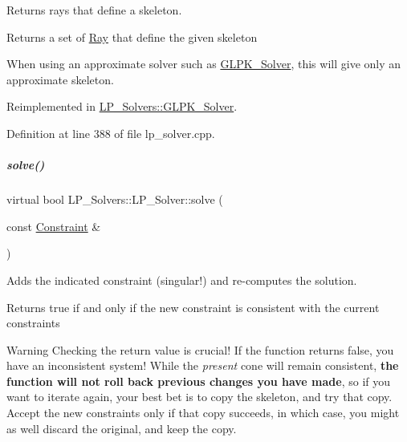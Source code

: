 Returns rays that define a skeleton. 

\begin{DoxyReturn}{Returns}
a set of \hyperlink{group___c_l_s_solvers_class_l_p___solvers_1_1_ray}{Ray} that define the given skeleton
\end{DoxyReturn}
When using an approximate solver such as \hyperlink{group___c_l_s_solvers_class_l_p___solvers_1_1_g_l_p_k___solver}{G\+L\+P\+K\+\_\+\+Solver}, this will give only an approximate skeleton. 

Reimplemented in \hyperlink{group___c_l_s_solvers_a9ded7ec7a82decb93132e10e25851528}{L\+P\+\_\+\+Solvers\+::\+G\+L\+P\+K\+\_\+\+Solver}.



Definition at line 388 of file lp\+\_\+solver.\+cpp.

\mbox{\label{group___c_l_s_solvers_a8b9979fb228ac9ccfe037ad6ca48b314}} 
\subparagraph{\texorpdfstring{solve()}{solve()}\hspace{0.1cm}{\footnotesize\ttfamily [1/2]}}
{\footnotesize\ttfamily virtual bool L\+P\+\_\+\+Solvers\+::\+L\+P\+\_\+\+Solver\+::solve (\begin{DoxyParamCaption}\item[{const \hyperlink{group___c_l_s_solvers_class_l_p___solvers_1_1_constraint}{Constraint} \&}]{ }\end{DoxyParamCaption})\hspace{0.3cm}{\ttfamily [pure virtual]}}



Adds the indicated constraint (singular!) and re-\/computes the solution. 

\begin{DoxyReturn}{Returns}
{\ttfamily true} if and only if the new constraint is consistent with the current constraints
\end{DoxyReturn}
\begin{DoxyWarning}{Warning}
Checking the return value is crucial! If the function returns {\ttfamily false}, you have an inconsistent system! While the {\itshape present} cone will remain consistent, {\bfseries the function will not roll back previous changes you have made}, so if you want to iterate again, your best bet is to copy the skeleton, and try that copy. Accept the new constraints only if that copy succeeds, in which case, you might as well discard the original, and keep the copy. 
\end{DoxyWarning}



